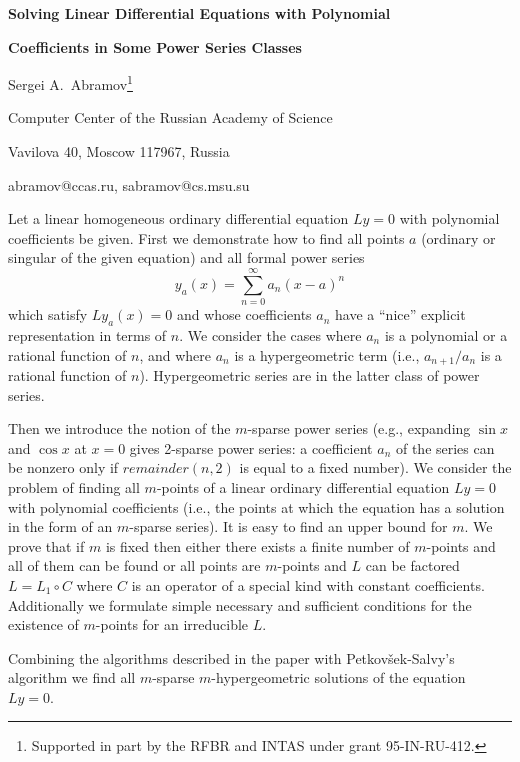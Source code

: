 

\centerline{\bf Solving Linear Differential Equations with Polynomial}
\centerline{\bf Coefficients in Some Power Series Classes}

\vskip 0.3cm

\centerline{Sergei A.~Abramov\thanks{Supported in part by
the RFBR and INTAS under grant 95-IN-RU-412.}}
\centerline{Computer Center of the Russian Academy of Science}
\centerline{Vavilova 40, Moscow 117967, Russia}
\centerline{abramov@ccas.ru, sabramov@cs.msu.su}

\vskip 0.3cm

Let a linear homogeneous ordinary differential equation $Ly=0$
with polynomial coefficients be given.
First we demonstrate how to find all points
$a$ (ordinary or singular of the given equation) and all formal power
series
$$y_a(x) = \sum _{n=0}^\infty a_n (x-a)^n$$
which satisfy $Ly_a(x)=0$ and whose coefficients $a_n$ have
a ``nice'' explicit representation in terms of $n$.
We consider the cases where $a_n$ is a polynomial or a rational
function of $n$, and where $a_n$ is a hypergeometric term (i.e.,
$a_{n+1}/a_n$ is a rational function of $n$). Hypergeometric series
are in the latter class of power series.

Then we introduce the notion of the $m$-sparse power series
(e.g., expanding $\sin x$ and $\cos x$ at $x=0$ gives
2-sparse power series: a coefficient $a_n$ of the series
can be nonzero only if $remainder(n,2)$ is equal to a
fixed number). We consider the problem of finding all
$m$-points of a linear ordinary differential equation
$Ly=0$ with polynomial coefficients (i.e., the points
at which the equation has a solution in the form of an
$m$-sparse series). It is easy to find an upper bound for $m$.
We prove that if $m$ is fixed then either there exists a finite
number of $m$-points and all of them can be found or all points
are $m$-points and $L$ can be factored $L=L_1 \circ C$ where $C$
is an operator of a special kind with constant coefficients.
Additionally we formulate simple necessary and sufficient
conditions for the existence of $m$-points for an irreducible $L$.

Combining the algorithms described in the paper with
Petkov\v sek-Salvy's algorithm we find all $m$-sparse
$m$-hypergeometric solutions of the equation $Ly=0$.


